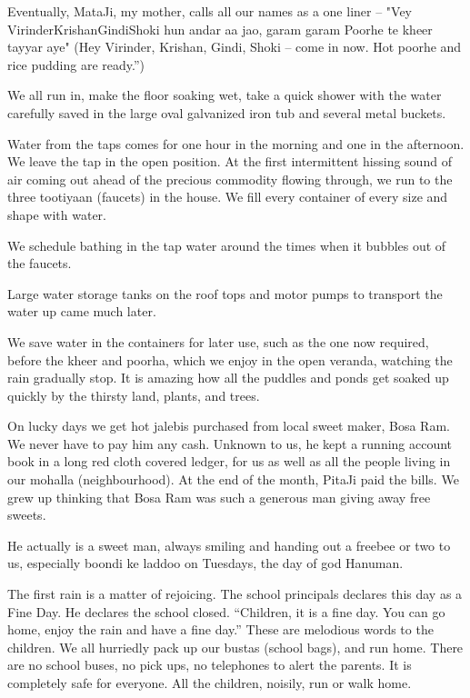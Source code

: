 Eventually, MataJi, my mother, calls all our names as a one liner – "Vey
VirinderKrishanGindiShoki hun andar aa jao, garam garam Poorhe te kheer
tayyar aye" (Hey Virinder, Krishan, Gindi, Shoki – come in now. Hot poorhe
and rice pudding are ready.”)
 
We all run in, make the floor soaking wet, take a quick shower with the
water carefully saved in the large oval galvanized iron tub and several
metal buckets. 

Water from the taps comes for one hour in the morning and one in the
afternoon. We leave the tap in the open position. At the first
intermittent hissing sound of air coming out ahead of the precious
commodity flowing through, we run to the three tootiyaan (faucets) in the
house. We fill every container of every size and shape with water. 

We schedule bathing in the tap water around the times when it bubbles out
of the faucets. 

Large water storage tanks on the roof tops and motor pumps to transport
the water up came much later. 
 
We save water in the containers for later use, such as the one now
required, before the kheer and poorha, which we enjoy in the open veranda,
watching the rain gradually stop. It is amazing how all the puddles and
ponds get soaked up quickly by the thirsty land, plants, and trees. 
 
On lucky days we get hot jalebis purchased from local sweet maker, Bosa
Ram. We never have to pay him any cash. Unknown to us, he kept a running
account book in a long red cloth covered ledger, for us as well as all the
people living in our mohalla (neighbourhood). At the end of the month,
PitaJi paid the bills. We grew up thinking that Bosa Ram was such
a generous man giving away free sweets. 

He actually is a sweet man, always smiling and handing out a freebee or
two to us, especially boondi ke laddoo on Tuesdays, the day of god
Hanuman.
 
The first rain is a matter of rejoicing. The school principals declares
this day as a Fine Day. He declares the school closed. “Children, it is
a fine day. You can go home, enjoy the rain and have a fine day.” These
are melodious words to the children. We all hurriedly pack up our bustas
(school bags), and run home. There are no school buses, no pick ups, no
telephones to alert the parents. It is completely safe for everyone. All
the children, noisily, run or walk home. 

